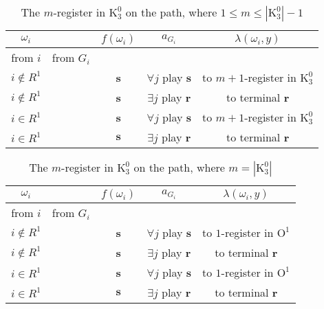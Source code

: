 \documentclass[12pt,letter]{article}
\newcommand{\Kappa}{\mathrm{K}}
\newcommand{\Omicron}{\mathrm{O}}
\theoremstyle{definition}
\theoremstyle{remark}
\theoremstyle{claim}
\begin{document}
\begin{table}[!htbp]
\caption{The $m$-register in $\Kappa^0_{3}$ on the path, where $1\leq m \leq |\Kappa^0_3|-1$}
\begin{center}
\begin{tabular}{c c | c | c | c}
$\omega_i$ 	 & 	   &	$f(\omega_i)$  &	$a_{G_i}$ & $\lambda(\omega_i,y)$ \\
\hline
\hline
from $i$ 	 & from $G_i$	  & 	&	 & \\
\hline
$i\notin R^1$  	&	& \textbf{s} & $\forall j$ play $\textbf{s}$ 	& to $m+1$-register in $\Kappa^0_{3}$\\
$i\notin R^1$  	&  & \textbf{s}  &  $\exists j$ play $\textbf{r}$  	& to terminal \textbf{r}\\
$i\in R^1$  	& 	 & \textbf{s}  &  $\forall j$ play $\textbf{s}$  	& to $m+1$-register in $\Kappa^0_{3}$\\
$i\in R^1$  	& 	& $\textbf{s}$	& $\exists j$ play $\textbf{r}$  & to terminal \textbf{r}\\
\hline
\end{tabular}
\end{center}
\end{table}


\begin{table}[!htbp]
\caption{The $m$-register in $\Kappa^0_{3}$ on the path, where $m=|\Kappa^0_3|$}
\begin{center}
\begin{tabular}{c c | c | c | c}
$\omega_i$ 	 & 	   &	$f(\omega_i)$  &	$a_{G_i}$ & $\lambda(\omega_i,y)$ \\
\hline
\hline
from $i$ 	 & from $G_i$	  & 	&	 & \\
\hline
$i\notin R^1$  	& 	& \textbf{s} & $\forall j$ play $\textbf{s}$ 	& to $1$-register in $\Omicron^1$\\
$i\notin R^1$  	&  & \textbf{s}  &  $\exists j$ play $\textbf{r}$  	& to terminal \textbf{r}\\
$i\in R^1$  	& 	 & \textbf{s}  &  $\forall j$ play $\textbf{s}$  	& to $1$-register in $\Omicron^1$\\
$i\in R^1$  	& 	& $\textbf{s}$	& $\exists j$ play $\textbf{r}$  & to terminal \textbf{r}\\
\hline
\end{tabular}
\end{center}
\end{table}


\clearpage
\end{document}

